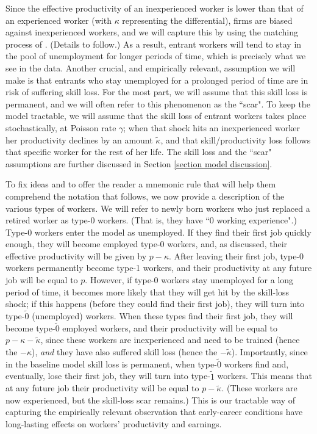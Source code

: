 \documentclass[12pt]{article} %
\theoremstyle{definition}
\begin{document}
Since the effective productivity of an inexperienced worker is lower than that of an experienced worker (with $\kappa$ representing the differential), firms are biased against inexperienced workers, and we will capture this by using the matching process of \cite{petrongolo2001looking}. (Details to follow.) As a result, entrant workers will tend to stay in the pool of unemployment for longer periods of time, which is precisely what we see in the data. Another crucial, and empirically relevant, assumption we will make is that entrants who stay unemployed for a prolonged period of time are in risk of suffering skill loss. For the most part, we will assume that this skill loss is permanent, and we will often refer to this phenomenon as the ``scar".
To keep the model tractable, we will assume that the skill loss of entrant workers takes place stochastically, at Poisson rate $\gamma$; when that shock hits an inexperienced worker her productivity declines by an amount $\tilde{\kappa}$, and that skill/productivity loss follows that specific worker for the rest of her life. The skill loss and the ``scar" assumptions are further discussed in Section \ref{section model discussion}.   

To fix ideas and to offer the reader a mnemonic rule that will help them comprehend the notation that follows, we now provide a description of the various types of workers. We will refer to newly born workers who just replaced a retired worker as type-0 workers. (That is, they have ``0 working experience".) 
Type-0 workers enter the model as unemployed. If they find their first job quickly enough, they will become employed type-0 workers, and, as discussed, their effective productivity will be given by $p-\kappa$. After leaving their first job, type-0 workers permanently become type-1 workers, and their productivity at any future job will be equal to $p$. However, if type-0 workers stay unemployed for a long period of time, it becomes more likely that they will get hit by the skill-loss shock; if this happens (before they could find their first job), they will turn into type-$\tilde{0}$ (unemployed) workers. When these types find their first job, they will become type-$\tilde{0}$ employed workers, and their productivity will be equal to $p-\kappa-\tilde{\kappa}$, since these workers are inexperienced {and} need to be trained (hence the $-{\kappa}$), \textit{and} they have also suffered skill loss (hence the $-\tilde{\kappa}$). Importantly, since in the baseline model skill loss is permanent, when type-$\tilde{0}$ workers find and, eventually, lose their first job, they will turn into type-$\tilde{1}$ workers. This means that at any future job their productivity will be equal to $p-\tilde{\kappa}$. (These workers are now experienced, but the skill-loss scar remains.) This is our tractable way of capturing the empirically relevant observation that early-career conditions have long-lasting effects on workers' productivity and earnings.  
   
\end{document}
